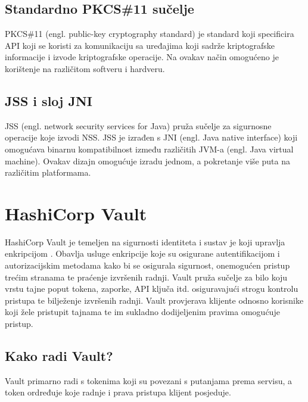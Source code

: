 \documentclass[]{foi}
\begin{document}
\subsection{Standardno PKCS\#11 sučelje}
PKCS\#11 (engl. public-key cryptography standard) je standard koji specificira API koji se koristi za komunikaciju sa uređajima koji sadrže kriptografske informacije i izvode kriptografske operacije.
Na ovakav način omogućeno je korištenje na različitom softveru i hardveru.
\subsection{JSS i sloj JNI}
JSS (engl. network security services for Java) pruža sučelje za sigurnosne operacije koje izvodi NSS.
JSS je izrađen s JNI (engl. Java native interface) koji omogućava binarnu kompatibilnost između različitih JVM-a (engl. Java virtual machine).
Ovakav dizajn omogućuje izradu jednom, a pokretanje više puta na različitim platformama.
\pagebreak
\section{HashiCorp Vault}

HashiCorp Vault je temeljen na sigurnosti identiteta i sustav je koji upravlja enkripcijom \cite{hashicorp-vault-what-is}.
Obavlja usluge enkripcije koje su osigurane autentifikacijom i autorizacijskim metodama kako bi se osigurala sigurnost, onemogućen pristup trećim stranama te praćenje izvršenih radnji.
Vault pruža sučelje za bilo koju vrstu tajne poput tokena, zaporke, API ključa itd. osiguravajući strogu kontrolu pristupa te bilježenje izvršenih radnji.
Vault provjerava klijente odnosno korisnike koji žele pristupit tajnama te im sukladno dodijeljenim pravima omogućuje pristup.

\subsection{Kako radi Vault?}

Vault primarno radi s tokenima koji su povezani s putanjama prema servisu, a token ordređuje koje radnje i prava pristupa klijent posjeduje.
\end{document}

